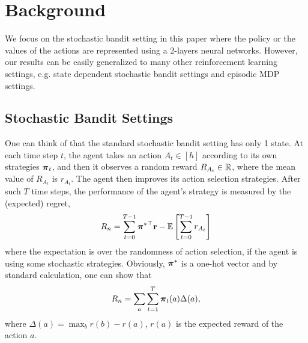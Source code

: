 \section{Background}
\label{sec:background}

We focus on the stochastic bandit setting in this paper where the policy or the values of the actions are represented using a 2-layers neural networks.  
However, our results can be easily generalized to many other reinforcement learning settings, e.g. state dependent stochastic bandit settings and episodic MDP settings.

\subsection{Stochastic Bandit Settings}
\label{subsec:settings}

One can think of that the standard stochastic bandit setting has only 1 state.  
At each time step $t$, the agent takes an action $A_t \in [h]$ according to its own strategies ${\boldsymbol{\pi}}_t$, and then it observes a random reward $R_{A_t} \in {\mathbb{R}}$, where the mean value of $R_{A_t}$ is $r_{A_t}$. 
The agent then improves its action selection strategies. 
After such $T$ time steps, the performance of the agent's strategy is measured by the (expected) regret,
\begin{equation}
\label{eq:expected_regret}
R_n = \sum\limits_{t=0}^{T-1}{{{\boldsymbol{\pi}}^*}^\top {\mathbf{r}}} - {\mathbb{E}} \left[ \sum\limits_{t=0}^{T-1}{  r_{ A_t}  } \right] 
\end{equation}
where the expectation is over the randomness of action selection, if the agent is using some stochastic strategies.
Obviously, ${\boldsymbol{\pi}}^*$ is a one-hot vector and by standard calculation, one can show that
\[
R_n = \sum_a \sum_{t=1}^T {\boldsymbol{\pi}}_t(a) \Delta(a),
\]
where $\Delta(a) = \max_b r(b)- r(a)$, $r(a)$ is the expected reward of the action $a$.


